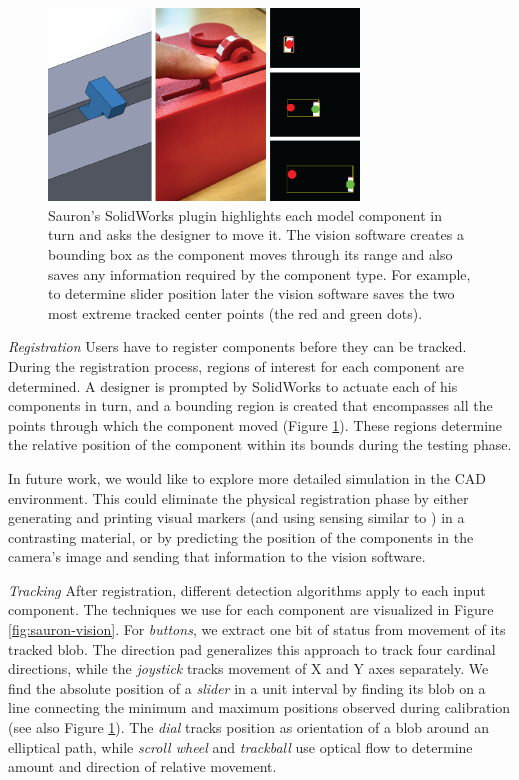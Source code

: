 \begin{figure}
\centering
\includegraphics[width=3.25in]{figures/sauron/vision-slider.png}
\caption{Sauron's SolidWorks plugin highlights each model component in turn and asks the designer to move it.  The vision software creates a bounding box as the component moves through its range and also saves any information required by the component type.  For example, to determine slider position later the vision software saves the two most extreme tracked center points (the red and green dots).}
\label{fig:sauron-vision-process}
\end{figure}

\emph{Registration}
Users have to register components before they can be tracked. During the registration process, regions of interest for each component are determined. A designer is prompted by SolidWorks to actuate each of his components in turn, and a bounding region is created that encompasses all the points through which the component moved (Figure \ref{fig:sauron-vision-process}). These regions determine the relative position of the component within its bounds during the testing phase.

In future work, we would like to explore more detailed simulation in the CAD environment. This could eliminate the physical registration phase by either generating and printing visual markers (and using sensing similar to \cite{doering-composition}) in a contrasting material, or by predicting the position of the components in the camera's image and sending that information to the vision software.

\emph{Tracking}
After registration, different detection algorithms apply to each input component. The techniques we use for each component are visualized in Figure \ref{fig:sauron-vision}. For {\em buttons}, we extract one bit of status from movement of its tracked blob. The direction pad generalizes this approach to track four cardinal directions, while the {\em joystick} tracks movement of X and Y axes separately. We find the absolute position of a {\em slider} in a unit interval by finding its blob on a line connecting the minimum and maximum positions observed during calibration (see also Figure \ref{fig:sauron-vision-process}). The {\em dial} tracks position as orientation of a blob around an elliptical path, while {\em scroll wheel} and {\em trackball} use optical flow to determine amount and direction of relative movement.

